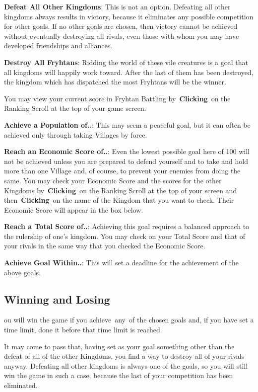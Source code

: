 \textbf{Defeat All Other Kingdoms}: This is not an option. Defeating all other kingdoms always results in victory, because it eliminates any possible competition for other goals. If no other goals are chosen, then victory cannot be achieved without eventually destroying all rivals, even those with whom you may have developed friendships and alliances.

\textbf{Destroy All Fryhtans}: Ridding the world of these vile creatures is a goal that all kingdoms will happily work toward. After the last of them has been destroyed, the kingdom which has dispatched the most Fryhtans will be the winner.

You may view your current score in Fryhtan Battling by \textbf{Clicking} on the Ranking Scroll at the top of your game screen.

\textbf{Achieve a Population of..}: This may seem a peaceful goal, but it can often be achieved only through taking Villages by force.

\textbf{Reach an Economic Score of..}: Even the lowest possible goal here of 100 will not be achieved unless you are prepared to defend yourself and to take and hold more than one Village and, of course, to prevent your enemies from doing the same. You may check your Economic Score and the scores for the other Kingdoms by \textbf{Clicking} on the Ranking Scroll at the top of your screen and then \textbf{Clicking} on the name of the Kingdom that you want to check. Their Economic Score will appear in the box below.

\textbf{Reach a Total Score of..}: Achieving this goal requires a balanced approach to the rulership of one’s kingdom. You may check on your Total Score and that of your rivals in the same way that you checked the Economic Score.

\textbf{Achieve Goal Within..}: This will set a deadline for the achievement of the above goals.

\subsection{Winning and Losing}

ou will win the game if you achieve any of the chosen goals and, if you have set a time limit, done it before that time limit is reached.

It may come to pass that, having set as your goal something other than the defeat of all of the other Kingdoms, you find a way to destroy all of your rivals anyway. Defeating all other kingdoms is always one of the goals, so you will still win the game in such a case, because the last of your competition has been eliminated.

